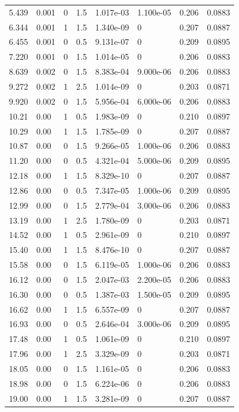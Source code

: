 \documentclass[preview]{standalone}
\begin{document}
{{\begin{tabular}{L{1.2cm}C{1.2cm} C{0.3cm}C{0.5cm} C{1.4cm}C{1.4cm} C{1.4cm}C{1.4cm}}
  5.439  &  0.001  & 0     & 1.5 &  1.017e-03  & 1.100e-05  & 0.206 &  0.0883   \\ 
  6.344  &  0.001  & 1     & 1.5 &  1.340e-09  & 0  & 0.207 &  0.0887   \\ 
  6.455  &  0.001  & 0     & 0.5 &  9.131e-07  & 0  & 0.209 &  0.0895   \\ 
  7.220  &  0.001  & 0     & 1.5 &  1.014e-05  & 0  & 0.206 &  0.0883   \\ 
  8.639  &  0.002  & 0     & 1.5 &  8.383e-04  & 9.000e-06  & 0.206 &  0.0883   \\ 
  9.272  &  0.002  & 1     & 2.5 &  1.014e-09  & 0  & 0.203 &  0.0871   \\ 
  9.920  &  0.002  & 0     & 1.5 &  5.956e-04  & 6.000e-06  & 0.206 &  0.0883   \\ 
  10.21  &  0.00  & 1     & 0.5 &  1.983e-09  & 0  & 0.210 &  0.0897   \\ 
  10.29  &  0.00  & 1     & 1.5 &  1.785e-09  & 0  & 0.207 &  0.0887   \\ 
  10.87  &  0.00  & 0     & 1.5 &  9.266e-05  & 1.000e-06  & 0.206 &  0.0883   \\ 
  11.20  &  0.00  & 0     & 0.5 &  4.321e-04  & 5.000e-06  & 0.209 &  0.0895   \\ 
  12.18  &  0.00  & 1     & 1.5 &  8.329e-10  & 0  & 0.207 &  0.0887   \\ 
  12.86  &  0.00  & 0     & 0.5 &  7.347e-05  & 1.000e-06  & 0.209 &  0.0895   \\ 
  12.99  &  0.00  & 0     & 1.5 &  2.779e-04  & 3.000e-06  & 0.206 &  0.0883   \\ 
  13.19  &  0.00  & 1     & 2.5 &  1.780e-09  & 0  & 0.203 &  0.0871   \\ 
  14.52  &  0.00  & 1     & 0.5 &  2.961e-09  & 0  & 0.210 &  0.0897   \\ 
  15.40  &  0.00  & 1     & 1.5 &  8.476e-10  & 0  & 0.207 &  0.0887   \\ 
  15.58  &  0.00  & 0     & 1.5 &  6.119e-05  & 1.000e-06  & 0.206 &  0.0883   \\ 
  16.12  &  0.00  & 0     & 1.5 &  2.047e-03  & 2.200e-05  & 0.206 &  0.0883   \\ 
  16.30  &  0.00  & 0     & 0.5 &  1.387e-03  & 1.500e-05  & 0.209 &  0.0895   \\ 
  16.62  &  0.00  & 1     & 1.5 &  6.557e-09  & 0  & 0.207 &  0.0887   \\ 
  16.93  &  0.00  & 0     & 0.5 &  2.646e-04  & 3.000e-06  & 0.209 &  0.0895   \\ 
  17.48  &  0.00  & 1     & 0.5 &  1.061e-09  & 0  & 0.210 &  0.0897   \\ 
  17.96  &  0.00  & 1     & 2.5 &  3.329e-09  & 0  & 0.203 &  0.0871   \\ 
  18.05  &  0.00  & 0     & 1.5 &  1.161e-05  & 0  & 0.206 &  0.0883   \\ 
  18.98  &  0.00  & 0     & 1.5 &  6.224e-06  & 0  & 0.206 &  0.0883   \\ 
  19.00  &  0.00  & 1     & 1.5 &  3.281e-09  & 0  & 0.207 &  0.0887   \\ 
\hline 
\end{tabular} 

}}
\end{document}
